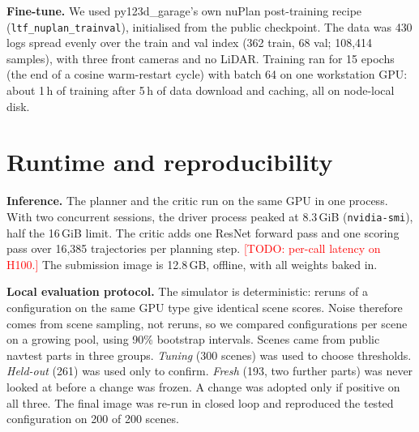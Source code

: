 \documentclass{article}
\newcommand{\todo}[1]{\textcolor{red}{[TODO: #1]}}
\begin{document}
\textbf{Fine-tune.} We used py123d\_garage's own nuPlan post-training recipe (\texttt{ltf\_nuplan\_trainval}),
initialised from the public checkpoint. The data was 430 logs spread evenly over the train and val index (362 train,
68 val; 108{,}414 samples), with three front cameras and no LiDAR. Training ran for 15 epochs (the end of a cosine
warm-restart cycle) with batch 64 on one workstation GPU: about 1\,h of training after 5\,h of data download and
caching, all on node-local disk.

\section{Runtime and reproducibility}
\textbf{Inference.} The planner and the critic run on the same GPU in one process. With two concurrent sessions,
the driver process peaked at 8.3\,GiB (\texttt{nvidia-smi}), half the 16\,GiB limit. The critic adds one ResNet
forward pass and one scoring pass over 16{,}385 trajectories per planning step. \todo{per-call latency on H100.}
The submission image is 12.8\,GB, offline, with all weights baked in.

\textbf{Local evaluation protocol.} The simulator is deterministic: reruns of a configuration on the same GPU type give
identical scene scores. Noise therefore comes from scene sampling, not reruns, so we compared configurations per scene
on a growing pool, using 90\% bootstrap intervals. Scenes came from public navtest parts in three groups. \emph{Tuning}
(300 scenes) was used to choose thresholds. \emph{Held-out} (261) was used only to confirm. \emph{Fresh} (193, two
further parts) was never looked at before a change was frozen. A change was adopted only if positive on all three.
The final image was re-run in closed loop and reproduced the tested configuration on 200 of 200 scenes.
\end{document}
